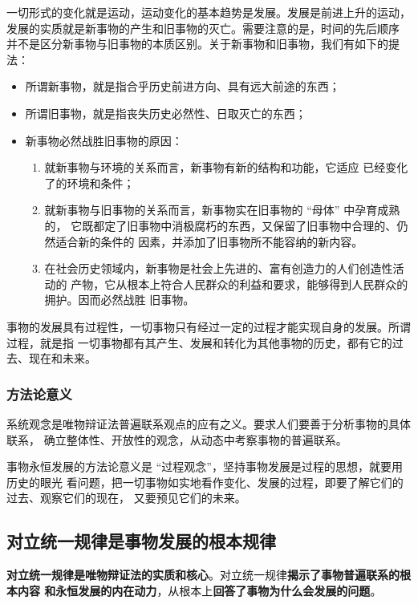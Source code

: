 \documentclass[utf-8, 10pt]{article}
\begin{document}
一切形式的变化就是运动，运动变化的基本趋势是发展。发展是前进上升的运动，
发展的实质就是新事物的产生和旧事物的灭亡。需要注意的是，时间的先后顺序
并不是区分新事物与旧事物的本质区别。关于新事物和旧事物，我们有如下的提法：
\begin{itemize}[itemsep=0pt]
    \item 所谓新事物，就是指合乎历史前进方向、具有远大前途的东西；
    \item 所谓旧事物，就是指丧失历史必然性、日取灭亡的东西；
    \item 新事物必然战胜旧事物的原因：
    \begin{enumerate}[label={${\arabic*}^\circ$}, itemsep=0pt]
        \item 就新事物与环境的关系而言，新事物有新的结构和功能，它适应
        已经变化了的环境和条件；
        \item 就新事物与旧事物的关系而言，新事物实在旧事物的 “母体” 中孕育成熟的，
        它既都定了旧事物中消极腐朽的东西，又保留了旧事物中合理的、仍然适合新的条件的
        因素，并添加了旧事物所不能容纳的新内容。
        \item 在社会历史领域内，新事物是社会上先进的、富有创造力的人们创造性活动的
        产物，它从根本上符合人民群众的利益和要求，能够得到人民群众的拥护。因而必然战胜
        旧事物。
    \end{enumerate}
\end{itemize}
事物的发展具有过程性，一切事物只有经过一定的过程才能实现自身的发展。所谓过程，就是指
一切事物都有其产生、发展和转化为其他事物的历史，都有它的过去、现在和未来。

\subsubsection{方法论意义}

系统观念是唯物辩证法普遍联系观点的应有之义。要求人们要善于分析事物的具体联系，
确立整体性、开放性的观念，从动态中考察事物的普遍联系。

事物永恒发展的方法论意义是 “过程观念”，坚持事物发展是过程的思想，就要用历史的眼光
看问题，把一切事物如实地看作变化、发展的过程，即要了解它们的过去、观察它们的现在，
又要预见它们的未来。

\subsection{对立统一规律是事物发展的根本规律}

\textbf{对立统一规律是唯物辩证法的实质和核心}。对立统一规律\textbf{揭示了事物普遍联系的根本内容
和永恒发展的内在动力}，从根本上\textbf{回答了事物为什么会发展的问题}。
\end{document}
